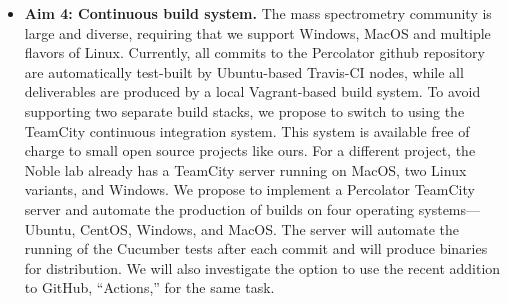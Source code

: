 \documentclass{article}
\begin{document}
\begin{itemize}
\item {\bf Aim 4: Continuous build system.} The mass spectrometry community is large and diverse, requiring that we support Windows, MacOS and multiple flavors of Linux.  Currently, all commits to the Percolator github repository are automatically test-built by Ubuntu-based Travis-CI nodes, while all deliverables are produced by a local Vagrant-based build system. To avoid supporting two separate build stacks, we propose to switch to using the TeamCity continuous integration system.  This system is available free of charge to small open source projects like ours.  For a different project, the Noble lab already has a TeamCity server running on MacOS, two Linux variants, and Windows.   We propose to implement a Percolator TeamCity server and automate the production of builds on four operating systems---Ubuntu, CentOS, Windows, and MacOS.  The server will automate the running of the Cucumber tests after each commit and will produce binaries for distribution. We will also investigate the option to use the recent addition to GitHub, ``Actions,'' for the same task.
\end{itemize}




\end{document}
